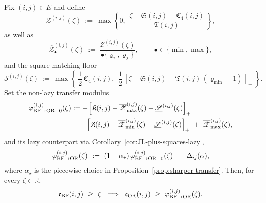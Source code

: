 \documentclass[twoside,11pt]{article}
\numberwithin{equation}{section}
\numberwithin{theorem}{section}
\numberwithin{example}{section}
\begin{document}
\begin{theorem}
\label{thm:bf-to-or}
Fix $(i,j)\in E$ and define
\[
\mathscr Z^{(i,j)}(\zeta)\ :=\ \max\!\left\{0,\ \frac{\,\zeta-\mathfrak S(i,j)-\mathfrak C_4(i,j)\,}{\mathfrak T(i,j)}\right\},
\]
as well as
\[
\overline{\mathscr Z}^{(i,j)}_{\bullet}(\zeta)\ :=\ \frac{\mathscr Z^{(i,j)}(\zeta)}{\bullet\{\varrho_i,\varrho_j\}},\qquad \ \bullet\in\{\min,\max\},
\]
and the square-matching floor
\begin{equation}
\label{eq:S-underline-rigorous}
\underline{\mathscr S}^{(i,j)}(\zeta)
\ :=\
\max\left\{\ \frac12\,\mathfrak C_4(i,j),\ \ \frac12\,\left[\zeta-\mathfrak S(i,j)-\mathfrak T(i,j)\,(\varrho_{\min}-1)\,\right]_+\ \right\}.
\end{equation}
Set the non-lazy transfer modulus
\begin{equation}
\label{eq:phi-nonlazy-square-rigorous}
\begin{aligned}
\varphi^{(i,j)}_{\rm BF\to OR-0}(\zeta)
&:=
-\Bigl[\mathfrak K(i,j)-\overline{\mathscr Z}^{(i,j)}_{\max}(\zeta)-\underline{\mathscr S}^{(i,j)}(\zeta)\Bigr]_+\\
&\quad
-\Bigl[\mathfrak K(i,j)-\overline{\mathscr Z}^{(i,j)}_{\min}(\zeta)-\underline{\mathscr S}^{(i,j)}(\zeta)\Bigr]_+
\ +\ \overline{\mathscr Z}^{(i,j)}_{\max}(\zeta),
\end{aligned}
\end{equation}
and its lazy counterpart via Corollary~\ref{cor:JL-plus-squares-lazy},
\begin{equation}
\label{eq:phi-lazy-square-rigorous}
\varphi^{(i,j)}_{\rm BF\to OR}(\zeta)
\ :=\ (1-\alpha_\star)\,\varphi^{(i,j)}_{\rm BF\to OR-0}(\zeta)\ -\ \Delta_{ij}(\alpha),
\end{equation}
where $\alpha_\star$ is the piecewise choice in Proposition~\ref{prop:sharper-transfer}. Then, for every $\zeta\in\mathbb R$,
\[
\mathfrak c_{\rm BF}(i,j)\ \ge\ \zeta\ \implies\ \mathfrak c_{\rm OR}(i,j)\ \ge\ \varphi^{(i,j)}_{\rm BF\to OR}(\zeta).
\]
\end{theorem}
\end{document}
